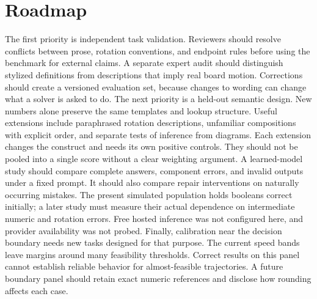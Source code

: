 \documentclass{article}
\begin{document}
\section{Roadmap}
The first priority is independent task validation. Reviewers should resolve conflicts between prose, rotation conventions, and endpoint rules before using the benchmark for external claims. A separate expert audit should distinguish stylized definitions from descriptions that imply real board motion. Corrections should create a versioned evaluation set, because changes to wording can change what a solver is asked to do.
The next priority is a held-out semantic design. New numbers alone preserve the same templates and lookup structure. Useful extensions include paraphrased rotation descriptions, unfamiliar compositions with explicit order, and separate tests of inference from diagrams. Each extension changes the construct and needs its own positive controls. They should not be pooled into a single score without a clear weighting argument.
A learned-model study should compare complete answers, component errors, and invalid outputs under a fixed prompt. It should also compare repair interventions on naturally occurring mistakes. The present simulated population holds booleans correct initially; a later study must measure their actual dependence on intermediate numeric and rotation errors. Free hosted inference was not configured here, and provider availability was not probed.
Finally, calibration near the decision boundary needs new tasks designed for that purpose. The current speed bands leave margins around many feasibility thresholds. Correct results on this panel cannot establish reliable behavior for almost-feasible trajectories. A future boundary panel should retain exact numeric references and disclose how rounding affects each case.
\end{document}
